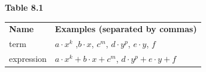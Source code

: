 {{\begin{center}
\begin{tabular}[t]{|l|l|}
    \end{tabular}
      \end{center}
    \begin{center}{\small\bfseries Table 8.1}\end{center}
          }{ %
        \begin{center}
      \label{m39383*uid3}
    \noindent
      \tablelasttail{}
      \begin{xtabular}[t]{|l|l|}\hline
        \textbf{Name} &
        \textbf{Examples (separated by commas)}%
     \tabularnewline{}
        term &
        $a\ensuremath{\cdot}{x}^{k}$ ,$b\ensuremath{\cdot}x$, ${c}^{m}$, $d\ensuremath{\cdot}{y}^{p}$, $e\ensuremath{\cdot}y$, $f$\hspace{20ex}%
     \tabularnewline{}
        expression &
        $a\ensuremath{\cdot}{x}^{k}+b\ensuremath{\cdot}x+{c}^{m}$, $d\ensuremath{\cdot}{y}^{p}+e\ensuremath{\cdot}y+f$%

\end{xtabular}
\end{center}}}
